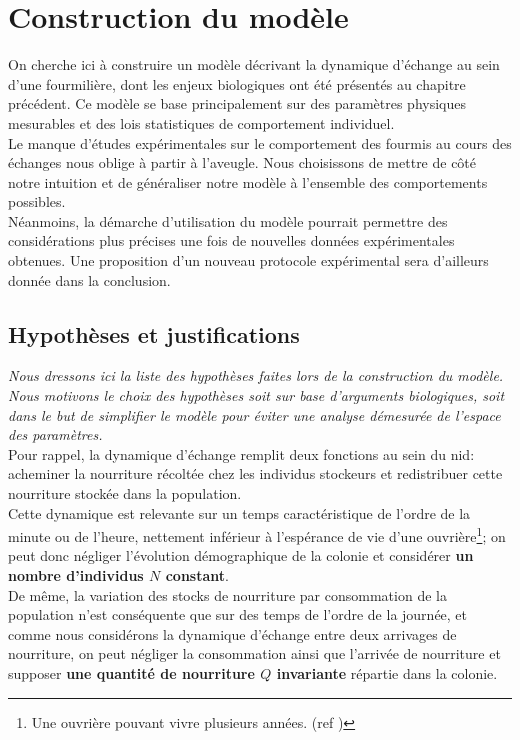 \chapter{Construction du modèle}

On cherche ici à construire un modèle décrivant la dynamique d'échange au sein d'une fourmilière, dont les enjeux biologiques ont été présentés au chapitre précédent. Ce modèle se base principalement sur des paramètres physiques mesurables et des lois statistiques de comportement individuel. \\

Le manque d'études expérimentales sur le comportement des fourmis au cours des échanges nous oblige à partir à l'aveugle. Nous choisissons de mettre de côté notre intuition et de généraliser notre modèle à l'ensemble des comportements possibles.\\

Néanmoins, la démarche d'utilisation du modèle pourrait permettre des considérations plus précises une fois de nouvelles données expérimentales obtenues. Une proposition d'un nouveau protocole expérimental sera d'ailleurs donnée dans la conclusion.


\section{Hypothèses et justifications}
\textit{Nous dressons ici la liste des hypothèses faites lors de la construction du modèle. Nous motivons le choix des hypothèses soit sur base d'arguments biologiques, soit dans le but de simplifier le modèle pour éviter une analyse démesurée de l'espace des paramètres.}\\

Pour rappel, la dynamique d'échange remplit deux fonctions au sein du nid: acheminer la nourriture récoltée chez les individus stockeurs et redistribuer cette nourriture stockée dans la population. \\

Cette dynamique est relevante sur un temps caractéristique de l'ordre de la minute ou de l'heure, nettement inférieur à l'espérance de vie d'une ouvrière\footnote{Une ouvrière pouvant vivre plusieurs années. (ref \fixme)}; on peut donc négliger l'évolution démographique de la colonie et considérer \textbf{un nombre d'individus $N$ constant}.\\

De même, la variation des stocks de nourriture par consommation de la population n'est conséquente que sur des temps de l'ordre de la journée, et comme nous considérons la dynamique d'échange entre deux arrivages de nourriture, on peut négliger la consommation ainsi que l'arrivée de nourriture et supposer \textbf{une quantité de nourriture $Q$ invariante} répartie dans la colonie.\\


